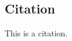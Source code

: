 \documentclass{article}
\begin{document}
    \subsection{Citation}
    This is a citation\cite{Eg}.
    \newpage
    
    
\end{document}
